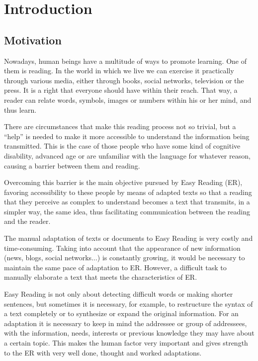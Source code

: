 \chapter{Introduction}
\label{cap:introduction}

\section{Motivation}
Nowadays, human beings have a multitude of ways to promote learning. One of them is reading. In the world in which we live we can exercise it practically through various media, either through books, social networks, television or the press. It is a right that everyone should have within their reach. That way, a reader can relate words, symbols, images or numbers within his or her mind, and thus learn.

 \setlength{\parskip}{10pt}

There are circumstances that make this reading process not so trivial, but a ``help'' is needed to make it more accessible to understand the information being transmitted. This is the case of those people who have some kind of cognitive disability, advanced age or are unfamiliar with the language for whatever reason, causing a barrier between them and reading.

 \setlength{\parskip}{10pt}

Overcoming this barrier is the main objective pursued by Easy Reading (ER), favoring accessibility to these people by means of adapted texts so that a reading that they perceive as complex to understand becomes a text that transmits, in a simpler way, the same idea, thus facilitating communication between the reading and the reader.

 \setlength{\parskip}{10pt}

The manual adaptation of texts or documents to Easy Reading is very costly and time-consuming. Taking into account that the appearance of new information (news, blogs, social networks...) is constantly growing, it would be necessary to maintain the same pace of adaptation to ER. However, a difficult task to manually elaborate a text that meets the characteristics of ER. 

 \setlength{\parskip}{10pt}

Easy Reading is not only about detecting difficult words or making shorter sentences, but sometimes it is necessary, for example, to restructure the syntax of a text completely or to synthesize or expand the original information. For an adaptation it is necessary to keep in mind the addressee or group of addressees, with the information, needs, interests or previous knowledge they may have about a certain topic. This makes the human factor very important and gives strength to the ER with very well done, thought and worked adaptations.

